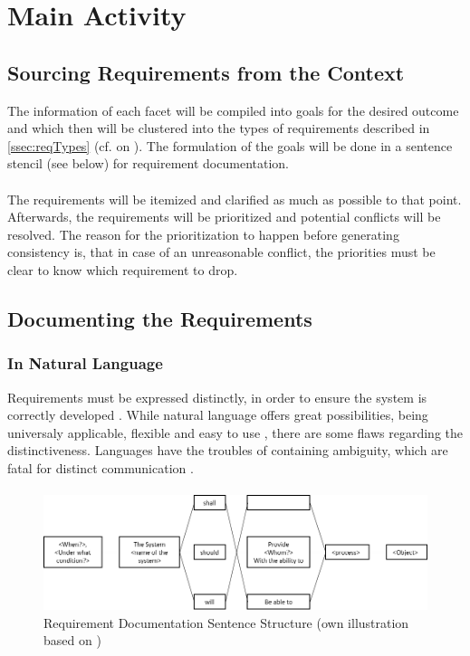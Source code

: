 \section{Main Activity}

\subsection{Sourcing Requirements from the Context}

The information of each facet will be compiled into goals for the desired outcome and which then will be clustered into the types of requirements described in \cref{ssec:reqTypes} (cf.  on ). The formulation of the goals will be done in a sentence stencil (see below) for requirement documentation. 

\paragraph{} The requirements will be itemized and clarified as much as possible to that point. Afterwards, the requirements will be prioritized and potential conflicts will be resolved. The reason for the prioritization to happen before generating consistency is, that in case of an unreasonable conflict, the priorities must be clear to know which requirement to drop.


\subsection{Documenting the Requirements}

\subsubsection{In Natural Language}
Requirements must be expressed distinctly, in order to ensure the system is correctly developed \parencites[107]{Ebert.2014}. While natural language offers great possibilities, being universaly applicable, flexible and easy to use \parencite[cf.][239]{Pohl.2007}, there are some flaws regarding the distinctiveness. Languages have the troubles of containing  ambiguity, which are fatal for distinct communication \parencite[cf.][239-243]{Pohl.2007}.

\paragraph{}
\begin{figure}[H]
    \centering
    \includegraphics[width=\textwidth]{img/SentenceStructure.png}
    \caption{Requirement Documentation Sentence Structure (own illustration based on \cite[246]{Pohl.2007})}
    \label{fig:sentencestructure}
\end{figure}

